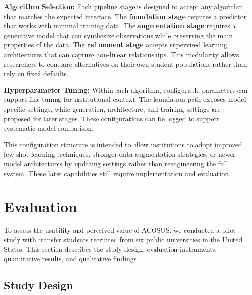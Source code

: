 \documentclass[letterpaper,11pt]{article}
\begin{document}
\textbf{Algorithm Selection:} Each pipeline stage is designed to accept any algorithm that matches the expected interface. The \textbf{foundation stage} requires a predictor that works with minimal training data. The \textbf{augmentation stage} requires a generative model that can synthesize observations while preserving the main properties of the data. The \textbf{refinement stage} accepts supervised learning architectures that can capture non-linear relationships. This modularity allows researchers to compare alternatives on their own student populations rather than rely on fixed defaults.

\textbf{Hyperparameter Tuning:} Within each algorithm, configurable parameters can support fine-tuning for institutional context. The foundation path exposes model-specific settings, while generation, architecture, and training settings are proposed for later stages. These configurations can be logged to support systematic model comparison.

This configuration structure is intended to allow institutions to adopt improved few-shot learning techniques, stronger data augmentation strategies, or newer model architectures by updating settings rather than reengineering the full system. These later capabilities still require implementation and evaluation.

\section{Evaluation}\label{sec:evaluation}

To assess the usability and perceived value of ACOSUS, we conducted a pilot study with transfer students recruited from six public universities in the United States. This section describes the study design, evaluation instruments, quantitative results, and qualitative findings.

\subsection{Study Design}\label{subsec:studydesign}

\end{document}
